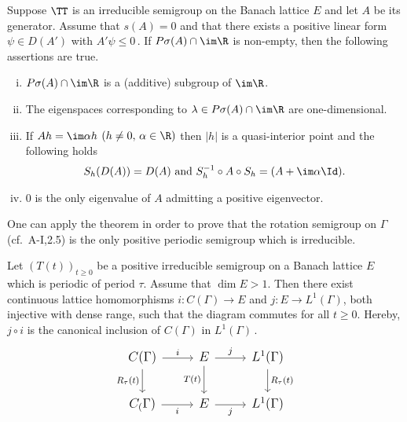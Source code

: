 \begin{theorem}\label{thm:c3-3.8}
	
	Suppose $\TT$ is an irreducible semigroup on the Banach lattice $E$ and let $A$ be its generator.
	Assume that $s(A) = 0$ and that there exists a positive linear form $\psi \in D(A')$ with $A'\psi \leq 0$\,.
%
If $P\sigma(A)\cap \im\R $ is non-empty, then the following assertions are true.
	\begin{enumerate}[(i), wide]
		\item 
			$P\sigma(A)\cap \im\R $ is a (additive) subgroup of $\im\R $.
	
		\item 
		The eigenspaces corresponding to $\lambda \in P\sigma(A)\cap \im\R $ are one-dimensional.
	
		\item 
		If $Ah = \im\alpha h$ $(h \neq 0,\, \alpha \in \R )$ then $|h|$ is a quasi-interior point and the following holds
		\begin{equation}\label{eq:c3-3.13}
			S_{h}(D(A)) = D(A) \text{ and } S_{h}^{-1}\circ A\circ S_{h} = (A + \im\alpha\Id).
		\end{equation}
		
		\item 
		$0$ is the only eigenvalue of $A$ admitting a positive eigenvector.

	\end{enumerate}
\end{theorem}

One can apply the theorem in order to prove that the rotation semigroup on $\Gamma$ (cf.\ A-I,2.5) is the only positive periodic semigroup which is irreducible.

\begin{corollary}\label{cor:c3-3.9}
	
	Let $(T(t))_{t\geq 0}$ be a positive irreducible semigroup on a Banach lattice $E$ which is periodic of period $\tau$.
	Assume that $\dim E > 1$.
	Then there exist continuous lattice homomorphisms
	$i \colon C(\Gamma) \to E$ and $j \colon E \to L^{1}(\Gamma)$,
	both injective with dense range,
	such that the diagram commutes for all $t\geq 0$.
	Hereby, $j\circ i$ is the canonical inclusion of $C(\Gamma)$ in $L^{1}(\Gamma)$\,.
	\[\large
	\begin{tikzcd}
		C(\Gamma) \arrow[r, "i"] \arrow[d, "R_\tau(t)"'] & E  \arrow[r, "j"] \arrow[d, "T(t)"'] & L^1(\Gamma) \arrow[d, "R_\tau(t)"] \\
		C_(\Gamma) \arrow[r, "i"'] & E \arrow[r, "j"'] & L^{1}(\Gamma)
	\end{tikzcd}
	\]
\end{corollary}
	
